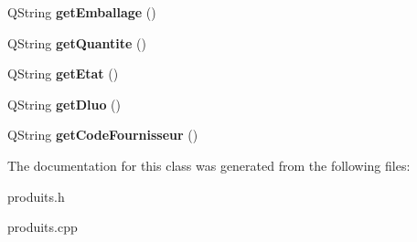 \begin{DoxyCompactItemize}
Q\+String {\bfseries get\+Emballage} ()
\item 
\mbox{\label{class_produits_a6bd3be10a39c03cc092befda9b8bc28e}} 
Q\+String {\bfseries get\+Quantite} ()
\item 
\mbox{\label{class_produits_a999d2dabebf4ad5c3e61a9333b7f78fa}} 
Q\+String {\bfseries get\+Etat} ()
\item 
\mbox{\label{class_produits_a7eeb9647a3fcf2a21e0d15da7fb5910c}} 
Q\+String {\bfseries get\+Dluo} ()
\item 
\mbox{\label{class_produits_a4e9998c0b687c784dd94b070f91040fd}} 
Q\+String {\bfseries get\+Code\+Fournisseur} ()
\end{DoxyCompactItemize}


The documentation for this class was generated from the following files\+:\begin{DoxyCompactItemize}
\item 
produits.\+h\item 
produits.\+cpp\end{DoxyCompactItemize}
